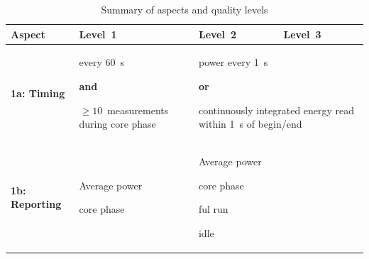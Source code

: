 \newlength{\tablecolumnwidth}
\setlength{\tablecolumnwidth}{3.5cm}
\noindent
\begin{table}
\caption{Summary of aspects and quality levels}
\label{tab:levels}
\begin{tabular}{|p{2.5cm}|p{3.5cm}|p{3.5cm}|p{3.5cm}|} \hline
\textbf{Aspect}&\textbf{Level~1}&\textbf{Level~2}&\textbf{Level~3}\\ \hline

\textbf{1a: Timing} &
\begin{minipage}[t]{\tablecolumnwidth}
      \begin{compactitemize}
            \item every 60~s
            \item[] \textbf{and}
            \item $\ge10$~measurements during core phase
      \end{compactitemize}
\end{minipage} &
\multicolumn{2}{p{2\tablecolumnwidth}|}{
      \begin{minipage}[t]{2\tablecolumnwidth}
            \begin{compactitemize}
                  \item power every \SI{1}{\second}
                  \item[] \textbf{or}
                  \item continuously integrated energy read within \SI{1}{\second} of begin/end
            \end{compactitemize}
      \end{minipage}
} \\
\hline


\textbf{1b: Reporting} &
\begin{minipage}[t]{\tablecolumnwidth}
      Average power
      \begin{compactitemize}
            \item core phase
      \end{compactitemize}
\end{minipage} &
\multicolumn{2}{p{2\tablecolumnwidth}|}{
      \begin{minipage}[t]{2\tablecolumnwidth}
            Average power
            \begin{compactitemize}
                  \item core phase
                  \item ful run
                  \item idle
            \end{compactitemize}
      \end{minipage}
} \\
\hline



\end{tabular}
\end{table}
